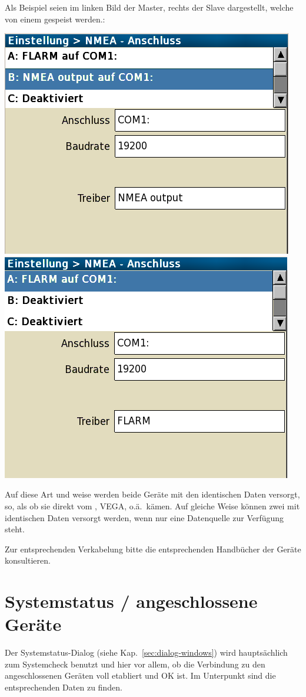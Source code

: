 Als Beispiel seien im linken Bild der Master, rechts der Slave dargestellt, welche von einem \fl gespeist werden.:


\begin{center}%
\includegraphics[angle=0,width=0.45\linewidth,keepaspectratio='true']{figures/config-nmea-ms-master.png}\quad
\includegraphics[angle=0,width=0.45\linewidth,keepaspectratio='true']{figures/config-nmea-ms-slave.png}
\end{center}


Auf diese Art und weise werden beide Geräte mit den identischen Daten versorgt, so, als ob sie direkt vom \fl, VEGA, o.ä.\ kämen. 
Auf gleiche Weise können zwei \al mit identischen Daten versorgt werden, wenn nur eine Datenquelle zur Verfügung steht.

Zur entsprechenden Verkabelung bitte die entsprechenden Handbücher der Geräte konsultieren.

\section{Systemstatus / angeschlossene Geräte}\label{sec:system-status-dialog}

Der Systemstatus-Dialog (siehe Kap.~\ref{sec:dialog-windows}) wird hauptsächlich zum Systemcheck benutzt und hier vor allem, ob die Verbindung zu den angeschlossenen 
Geräten voll etabliert und OK ist. 
Im Unterpunkt  sind die entsprechenden Daten zu finden.
